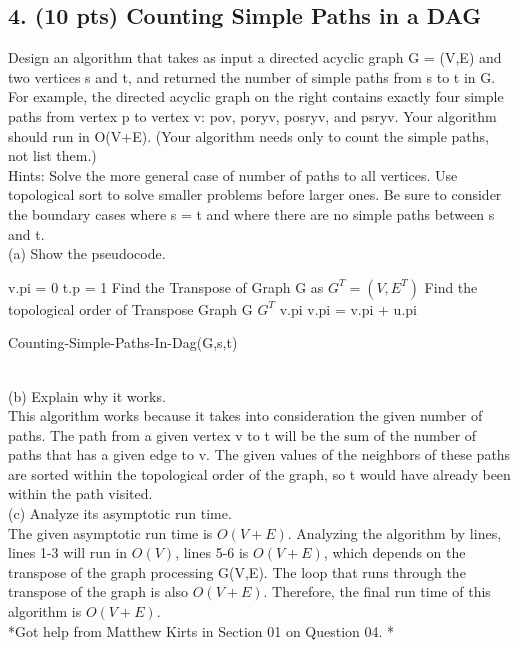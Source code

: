 \documentclass[12pt]{article}
\begin{document}
\subsection*{4. (10 pts) Counting Simple Paths in a DAG} 
Design an algorithm that takes as input a directed acyclic graph G = (V,E) and two vertices s and t, and returned the number of simple paths from s to t in G. For example, the directed acyclic graph on the right contains exactly four simple paths from vertex p to vertex v: pov, poryv, posryv, and psryv. Your algorithm should run in O(V+E). (Your algorithm needs only to count the simple paths, not list them.) \\
\linebreak
Hints: Solve the more general case of number of paths to all vertices. Use topological sort to solve smaller problems before larger ones. Be sure to consider the boundary cases where s = t and where there are no simple paths between s and t. \\
\linebreak
(a) Show the pseudocode. \\
\linebreak
\begin{algorithm}[H]
\SetAlgoLined
{} 
{
v.pi = 0 \;
}
\EndFor
t.p = 1 \;
Find the Transpose of Graph G as $G^T = (V,E^T)$ \;
Find the topological order of Transpose Graph G $G^T$ \;
{
{
\Return v.pi \;
}
\EndIf
{}
{
v.pi = v.pi + u.pi \;
}
\EndFor
}
\EndFor
 \caption{Counting-Simple-Paths-In-Dag(G,s,t)}
\end{algorithm} \\
(b) Explain why it works. \\
\linebreak
This algorithm works because it takes into consideration the given number of paths. The path from a given vertex v to t will be the sum of the number of paths that has a given edge to v.  The given values of the neighbors of these paths are sorted within the topological order of the graph, so t would have already been within the path visited.  \\
\linebreak
(c) Analyze its asymptotic run time. \\
The given asymptotic run time is $O(V+E)$.  Analyzing the algorithm by lines, lines 1-3 will run in $O(V)$, lines 5-6 is $O(V + E)$, which depends on the transpose of the graph processing G(V,E). The loop that runs through the transpose of the graph is also $O(V + E)$. Therefore, the final run time of this algorithm is $O(V + E)$.  \\
*Got help from Matthew Kirts in Section 01 on Question 04. *
\end{document}
